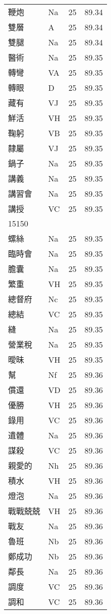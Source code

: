 \documentclass[twocolumn]{book}
\begin{document}
\begin{supertabular}{llrr}
鞭炮 & Na & 25 &  89.34\\
雙層 & A & 25 &  89.34\\
雙腿 & Na & 25 &  89.34\\
醫術 & Na & 25 &  89.35\\
轉彎 & VA & 25 &  89.35\\
轉眼 & D & 25 &  89.35\\
藏有 & VJ & 25 &  89.35\\
鮮活 & VH & 25 &  89.35\\
鞠躬 & VB & 25 &  89.35\\
隸屬 & VJ & 25 &  89.35\\
鍋子 & Na & 25 &  89.35\\
講義 & Na & 25 &  89.35\\
講習會 & Na & 25 &  89.35\\
講授 & VC & 25 &  89.35\\
15150\\
螺絲 & Na & 25 &  89.35\\
臨時會 & Na & 25 &  89.35\\
膽囊 & Na & 25 &  89.35\\
繁重 & VH & 25 &  89.35\\
總督府 & Nc & 25 &  89.35\\
總結 & VC & 25 &  89.35\\
縫 & Na & 25 &  89.35\\
營業稅 & Na & 25 &  89.35\\
曖昧 & VH & 25 &  89.35\\
幫 & Nf & 25 &  89.36\\
償還 & VD & 25 &  89.36\\
優勝 & VH & 25 &  89.36\\
錄用 & VC & 25 &  89.36\\
遺體 & Na & 25 &  89.36\\
謀殺 & VC & 25 &  89.36\\
親愛的 & Nh & 25 &  89.36\\
積水 & VH & 25 &  89.36\\
燈泡 & Na & 25 &  89.36\\
戰戰兢兢 & VH & 25 &  89.36\\
戰友 & Na & 25 &  89.36\\
魯班 & Nb & 25 &  89.36\\
鄭成功 & Nb & 25 &  89.36\\
鄰長 & Na & 25 &  89.36\\
調度 & VC & 25 &  89.36\\
調和 & VC & 25 &  89.36\\

\end{supertabular}
\end{document}
